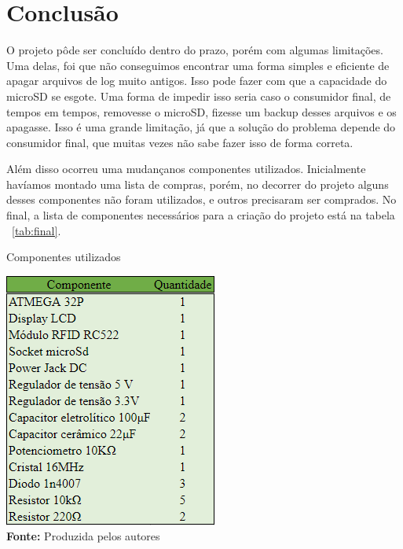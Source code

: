 \chapter{Conclusão}

O projeto pôde ser concluído dentro do prazo,
porém com algumas limitações. Uma delas, foi que
não conseguimos encontrar uma forma simples e
eficiente de apagar arquivos de log muito antigos.
Isso pode fazer com que a capacidade do microSD se
esgote. Uma forma de impedir isso seria caso o consumidor
final, de tempos em tempos, removesse o microSD, fizesse
um backup desses arquivos e os apagasse. Isso é uma
grande limitação, já que a solução do problema depende
do consumidor final, que muitas vezes não sabe fazer isso
de forma correta.

Além disso ocorreu uma mudançanos componentes utilizados.
Inicialmente havíamos montado uma lista de compras,
porém, no decorrer do projeto alguns desses componentes
não foram utilizados, e outros precisaram ser comprados.
No final, a lista de componentes necessários para
a criação do projeto está na tabela ~\ref{tab:final}.

\FloatBarrier
\begin{table}[!htbp]
	\centering
	\caption{Componentes utilizados}
	\includegraphics[scale=.7]{imagens/tabela_final}
	\\ \vspace{0.2cm}
	\textbf{Fonte:} Produzida pelos autores
	\label{tab:final}
\end{table}
\FloatBarrier


